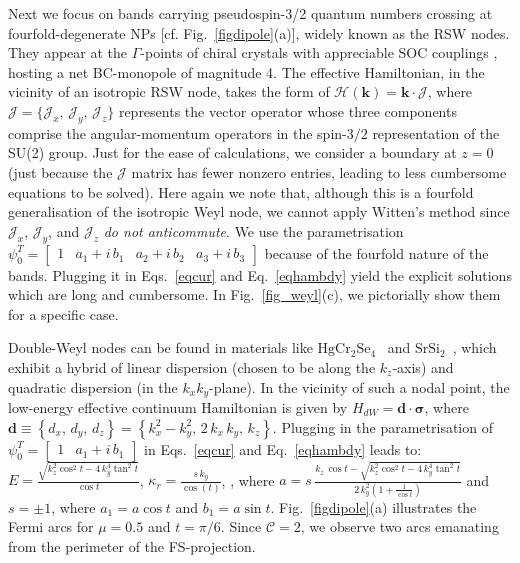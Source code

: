 \documentclass[aps,prl,twocolumn,nofootinbib,showkeys, nolongbibliography, 10pt]{revtex4-2}
\begin{document}
Next we focus on bands carrying pseudospin-3/2 quantum numbers crossing at fourfold-degenerate NPs [cf. Fig.~\ref{figdipole}(a)], widely known as the RSW nodes. They appear at the $\Gamma$-points of chiral crystals with appreciable SOC couplings \cite{grushin-multifold, multifold-rhsi, Yao2020, ips-rsw-ph,*ips-shreya,*ips-internode}, hosting a net BC-monopole of magnitude 4. The effective Hamiltonian, in the vicinity of an isotropic RSW node, takes the form of
$
\mathcal{H}(\boldsymbol{k}) =   {\mathbf k} \cdot \boldsymbol{\mathcal J} $,
where $ \boldsymbol{\mathcal J } = \lbrace {\mathcal J }_x,\, {\mathcal J }_y,\, {\mathcal J }_z \rbrace $ represents the vector operator whose three components comprise the angular-momentum operators in the spin-$3/2$ representation of the SU(2) group. Just for the ease of calculations, we consider a boundary at $z=0$ (just because the $\mathcal J$ matrix has fewer nonzero entries, leading to less cumbersome equations to be solved).
Here again we note that, although this is a fourfold generalisation of the isotropic Weyl node, we cannot apply Witten's method since $ \mathcal J_x$, $\mathcal J_y$, and $ \mathcal J_z $ \textit{do not anticommute}. We use the parametrisation $ \psi_0^T  = \begin{bmatrix}
1 & a_1 +i \, b_1 & a_2 + i\, b_2 & a_3 + i\, b_3  \end{bmatrix}$ because of the fourfold nature of the bands. Plugging it in Eqs.~\eqref{eqcur} and Eq.~\eqref{eqhambdy} yield the explicit solutions which are long and cumbersome. In Fig.~\ref{fig_weyl}(c), we pictorially show them for a specific case.




Double-Weyl nodes can be found in materials like $\mathrm{HgCr_2Se_4}$~\cite{Gang2011} and $\mathrm{SrSi_2}$~\cite{hasan_mweyl16, singh18_tunable}, which exhibit a hybrid of linear dispersion (chosen to be along the $k_z$-axis) and quadratic dispersion (in the $k_x k_y$-plane). In the vicinity of such a nodal point, the low-energy effective continuum Hamiltonian is given by \cite{bernevig,bernevig2, fu22_thermoelectric, ips_rahul_ph_strain, ips-ruiz, ips-tilted, chen16_thermoelectric}
$ H_{dW} = \boldsymbol{d} \cdot \boldsymbol{\sigma}$, where
$  \boldsymbol{d} \equiv \left\{ d_x,\, d_y, \, d_z \right\} = \left\{
k_x^2-k_y^2, \, 2 \,k_x \,k_y,\, k_z\right\} $.
Plugging in the parametrisation of $ \psi_0^T  = \begin{bmatrix}
1 & a_1 +i \, b_1 \end{bmatrix}$ in Eqs.~\eqref{eqcur} and Eq.~\eqref{eqhambdy} leads to:
$E = \frac{\sqrt{k_z^2 \cos^2  t-4 \,k_y^4 \tan ^2 t }}
{\cos t}$, $ \kappa _r =  \frac{ s \, k_y}{\cos (t)} $, , where
$a = s \, \frac{ k_z \,\cos t-\sqrt{k_z^2 \cos ^2 t-4 \,k_y^4 \tan^2 t} }
{2\, k_y^2 \left( 1 + \frac{1}{\cos t} \right)}$ and $s = \pm 1$, where $ a_1 = a \cos t$ and $ b_1 = a \sin t$.
Fig.~\ref{figdipole}(a) illustrates the Fermi arcs for $\mu=0.5$ and $ t = \pi/6 $. Since $\mathcal C =  2$, we observe two arcs emanating from the perimeter of the FS-projection.
\end{document}
